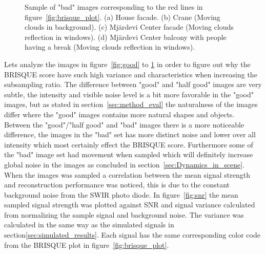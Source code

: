 \begin{figure}[H]
\begin{minipage}[t]{0.245\textwidth}
    \subcaption{}
    \label{fig:bad4}
\end{minipage}
    \caption{Sample of "bad" images corresponding to the red lines in figure~\ref{fig:brisque_plot}.
    (a)  House facade. (b) Crane (Moving clouds in background). (c) Mjärdevi Center facade (Moving clouds reflection in windows). (d) Mjärdevi Center balcony with people having a break (Moving clouds reflection in windows).}
    \label{fig:bad}
\end{figure}


Lets analyze the images in figure~\ref{fig:good} to \ref{fig:bad} in order to figure out why the BRISQUE score have such high variance and characteristics when increasing the subsampling ratio. The difference between "good" and "half good" images are very subtle, the intensity and visible noise level is a bit more favorable in the "good" images, but as stated in section~\ref{sec:method_eval} the naturalness of the images differ where the "good" images contains more natural shapes and objects. Between the "good"/"half good" and "bad" images there is a more noticeable difference, the images in the "bad" set has more distinct noise and lower over all intensity which most certainly effect the BRISQUE score. Furthermore some of the "bad" image set had movement when sampled which will definitely increase global noise in the images as concluded in section~\ref{sec:Dynamics_in_scene}.\\[0.1in]

When the images was sampled a correlation between the mean signal strength and reconstruction performance was noticed, this is due to the constant background noise from the SWIR photo diode. In figure~\ref{fig:snr} the mean sampled signal strength was plotted against SNR and signal variance calculated from normalizing the sample signal and background noise. The variance was calculated in the same way as the simulated signals in section\ref{sec:simulated_results}.  Each signal has the same corresponding color code from the BRISQUE plot in figure~\ref{fig:brisque_plot}.
 

